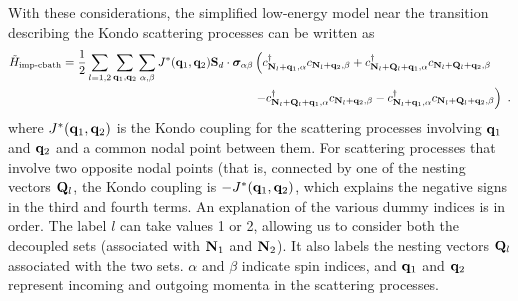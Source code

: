 \documentclass[reprint,hidelinks,onecolumn]{revtex4-2}
\begin{document}
With these considerations, the simplified low-energy model near the transition describing the Kondo scattering processes can be written as
\begin{equation}\begin{aligned}
	\tilde H_\text{imp-cbath} = \frac{1}{2}\sum_{l=1,2}\sum_{{\bf q}_1, {\bf q}_2}\sum_{\alpha,\beta}J^*({\bf q}_1, {\bf q}_2){\bf S}_d\cdot{\boldsymbol \sigma}_{\alpha\beta}&\left(c^\dagger_{{\bf N}_l + {\bf q}_1,\alpha}c_{{\bf N}_l + {\bf q}_2,\beta} + c^\dagger_{{\bf N}_l + {\bf Q}_l + {\bf q}_1,\alpha}c_{{\bf N}_l + {\bf Q}_l + {\bf q}_2,\beta} \right. \\
&\left. - c^\dagger_{{\bf N}_l + {\bf Q}_l + {\bf q}_1,\alpha}c_{{\bf N}_l + {\bf q}_2,\beta} - c^\dagger_{{\bf N}_l + {\bf q}_1,\alpha}c_{{\bf N}_l + {\bf Q}_l + {\bf q}_2,\beta}\right)~.
\end{aligned}\end{equation}
where \(J^*({\bf q}_1, {\bf q}_2)\) is the Kondo coupling for the scattering processes involving \({\bf q}_1\) and \({\bf q}_2\) and a common nodal point between them. For scattering processes that involve two opposite nodal points (that is, connected by one of the nesting vectors \({\bf Q}_l\), the Kondo coupling is \(-J^*({\bf q}_1, {\bf q}_2)\), which explains the negative signs in the third and fourth terms. An explanation of the various dummy indices is in order. The label \(l\) can take values 1 or 2, allowing us to consider both the decoupled sets (associated with \({\bf N}_1\) and \({\bf N}_2\)). It also labels the nesting vectors \({\bf Q}_l\) associated with the two sets. \(\alpha\) and \(\beta\) indicate spin indices, and \({\bf q}_1\) and \({\bf q}_2\) represent incoming and outgoing momenta in the scattering processes.
\end{document}
